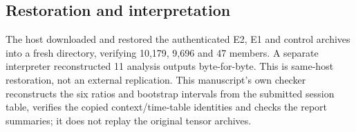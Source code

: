 \subsection{Restoration and interpretation}
The host downloaded and restored the authenticated E2, E1 and control archives into a fresh directory, verifying 10,179, 9,696 and 47 members. A separate interpreter reconstructed 11 analysis outputs byte-for-byte. This is same-host restoration, not an external replication. This manuscript's own checker reconstructs the six ratios and bootstrap intervals from the submitted session table, verifies the copied context/time-table identities and checks the report summaries; it does not replay the original tensor archives.

